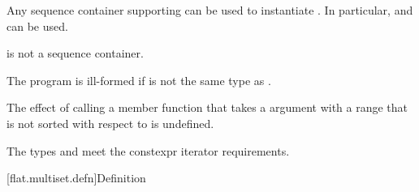 \pnum
Any sequence container
supporting 
can be used to instantiate .
In particular,
 and  can be used.
\begin{note}
 is not a sequence container.
\end{note}

\pnum
The program is ill-formed if  is not the same type
as .

\pnum
The effect of calling a member function
that takes a  argument with a range
that is not sorted with respect to  is undefined.

\pnum
The types  and  meet
the constexpr iterator requirements.

[flat.multiset.defn]{Definition}


